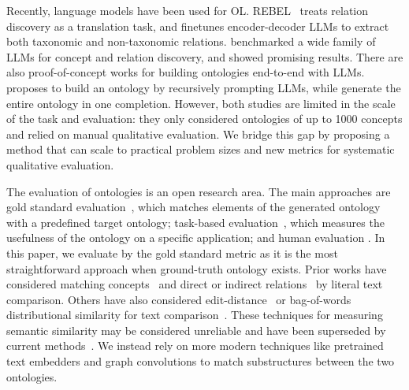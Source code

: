 \documentclass{article}
\begin{document}
Recently, language models have been used for OL. REBEL~\cite{cabot2021rebel} treats relation discovery as a translation task, and finetunes encoder-decoder LLMs to extract both taxonomic and non-taxonomic relations. \citet{babaei2023llms4ol} benchmarked a wide family of LLMs for concept and relation discovery, and showed promising results. There are also proof-of-concept works for building ontologies end-to-end with LLMs. \citet{funk2023towards} proposes to build an ontology by recursively prompting  LLMs, while \citet{trajanoska2023enhancing} generate the entire ontology in one completion. However, both studies are limited in the scale of the task and evaluation: they only considered ontologies of up to 1000 concepts and relied on manual qualitative evaluation. We bridge this gap by proposing a method that can scale to practical problem sizes and new metrics for systematic qualitative evaluation.

The evaluation of ontologies is an open research area. The main approaches are gold standard evaluation~\cite{Zavitsanos2011GoldSE}, which matches elements of the generated ontology with a predefined target ontology; task-based evaluation~\cite{porzel2004task}, which measures the usefulness of the ontology on a specific application; and human evaluation \cite{raad2015survey,brank2005survey}. In this paper, we evaluate by the gold standard metric as it is the most straightforward approach when ground-truth ontology exists. Prior works have considered matching concepts~\cite{maedche2002measuring} and direct or indirect relations~\cite{Kashyap2005TaxaMinerAE, Treeratpituk2013GraphbasedAT} by literal text comparison. Others have also considered edit-distance~\cite{Ehrig2005SimilarityFO} or bag-of-words distributional similarity for text comparison~\cite{Zavitsanos2011GoldSE}.  These techniques for measuring semantic similarity may be considered unreliable and have been superseded by current methods~\cite{conneau2017supervised}. We instead rely on more modern techniques like pretrained text embedders \cite{devlin2018bert} and graph convolutions \cite{kipf2016semi} to match substructures between the two ontologies.
\end{document}
